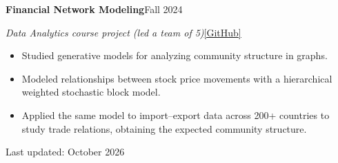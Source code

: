 \documentclass[11pt,letterpaper]{article}
\newcommand{\entry}[2]{\needspace{6\baselineskip}\textbf{#1}\hfill #2\par}
\newcommand{\sub}[2]{{\itshape #1}\hfill{#2}\par}
\newcommand{\gap}{\vspace{8pt}}
\begin{document}
\gap
\entry{Financial Network Modeling}{Fall 2024}
\sub{Data Analytics course project (led a team of 5)}{\href{https://github.com/IshaqHamza/DA_Financial_networks}{[GitHub]}}
\begin{itemize}
  \item Studied generative models for analyzing community structure in graphs.
  \item Modeled relationships between stock price movements with a hierarchical weighted stochastic block model.
  \item Applied the same model to import--export data across 200+ countries to study trade relations,
        obtaining the expected community structure.
\end{itemize}

\vfill
\begin{flushright}\small\color{softgray}Last updated: October 2026\end{flushright}
\end{document}
